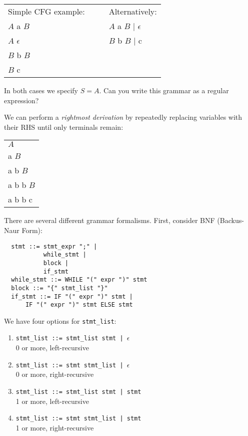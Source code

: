 \begin{slide*}

\begin{tabular}{llll}
Simple CFG example:    &&& Alternatively:\\
$A$ \RA{} a $B$        &&& $A$ \RA{} a $B$ $|$ $\epsilon$\\
$A$ \RA{} $\epsilon$   &&& $B$ \RA{} b $B$ $|$ c\\
$B$ \RA{} b $B$        &&& \\
$B$ \RA{} c            &&& 
\end{tabular}

\vspace{0.2in}

In both cases we specify $S = A$.
Can you write this grammar as a regular expression?

\vspace{0.2in}
We can perform a {\em rightmost derivation} by repeatedly replacing variables with their
RHS until only terminals remain:\\

\begin{tabular}{l}
\underline{$A$}\\
a \underline{$B$}\\
a b \underline{$B$}\\
a b b \underline{$B$}\\
a b b c
\end{tabular}
\vfil
\end{slide*}

\begin{slide*}
There are several different grammar formalisms.  First, consider BNF (Backus-Naur Form):
\begin{verbatim}
  stmt ::= stmt_expr ";" |
           while_stmt |
           block |
           if_stmt
  while_stmt ::= WHILE "(" expr ")" stmt
  block ::= "{" stmt_list "}"
  if_stmt ::= IF "(" expr ")" stmt |
      IF "(" expr ")" stmt ELSE stmt
\end{verbatim}

\vspace{0.2in}

We have four options for {\tt stmt\_list}:
\begin{enumerate}
\item {\tt stmt\_list ::= stmt\_list stmt | }$\epsilon$\\
\RA{} 0 or more, left-recursive
\item {\tt stmt\_list ::= stmt stmt\_list | }$\epsilon$\\
\RA{} 0 or more, right-recursive
\item {\tt stmt\_list ::= stmt\_list stmt | stmt}\\
\RA{} 1 or more, left-recursive
\item {\tt stmt\_list ::= stmt stmt\_list | stmt}\\
\RA{} 1 or more, right-recursive
\end{enumerate}

\vfil
\end{slide*}

